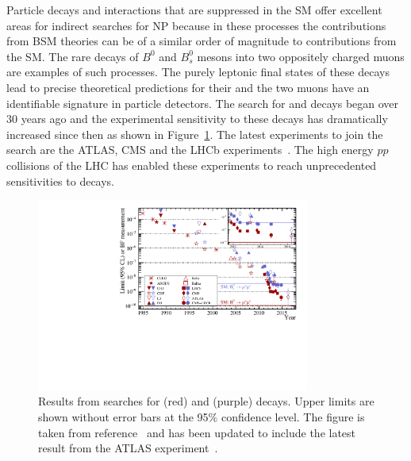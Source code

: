 Particle decays and interactions that are suppressed in the SM offer excellent areas for indirect searches for NP because in these processes the contributions from BSM theories can be of a similar order of magnitude to contributions from the SM. The rare decays of $B^{0}$ and $B^{0}_{s}$ mesons into two oppositely charged muons are examples of such processes. The purely leptonic final states of these decays lead to precise theoretical predictions for their \BFs and the two muons have an identifiable signature in particle detectors. The search for \bdmumu and \bsmumu decays began over 30 years ago and the experimental sensitivity to these decays has dramatically increased since then as shown in Figure~\ref{fig:bmumu_history}. The latest experiments to join the search are the ATLAS, CMS and the LHCb experiments~\cite{Aad:2012pn,Aaboud:2016ire, Chatrchyan:2011kr, Chatrchyan:2012rga, Chatrchyan:2013bka, Aaij:2011rja, LHCb:2011ac,Aaij:2012ac,Aaij:2012nna,Aaij:2013aka,CMS:2014xfa}. The high energy $pp$ collisions of the LHC has enabled these experiments to reach unprecedented sensitivities to \bmumu decays. 

\begin{figure}[tbp]
    \centering
        \includegraphics[width=0.8\textwidth]{./Figs/Introduction/95_CL.pdf}
    \caption{Results from searches for \bdmumu (red) and \bsmumu (purple) decays. Upper limits are shown without error bars at the 95$\%$ confidence level. The figure is taken from reference~\cite{CMS:2014xfa} and has been updated to include the latest result from the ATLAS experiment~\cite{Aaboud:2016ire}.}
    \label{fig:bmumu_history}
\end{figure}

